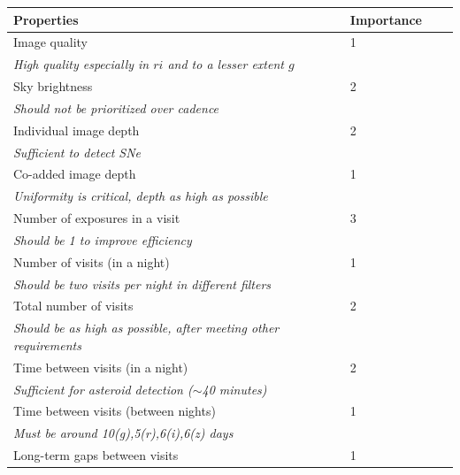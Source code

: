 \documentclass[12pt, letterpaper]{article}
\begin{document}
\newpage

\begin{minipage}{\columnwidth}
    \centering
    \begin{tabular}{l|l|l|l}
        \toprule
        Properties & Importance \hspace{.3in} \\
        \midrule
        Image quality  &  1   \\
        \hspace{20pt} \emph{High quality especially in $ri$ and to a lesser extent $g$} & \\
        Sky brightness & 2 \\
        \hspace{20pt} \emph{Should not be prioritized over cadence} &\\
        Individual image depth &  2 \\
        \hspace{20pt} \emph{Sufficient to detect SNe} & \\
        Co-added image depth  &  1 \\
        \hspace{20pt} \emph{Uniformity is critical, depth as high as possible} & \\
        Number of exposures in a visit  & 3  \\
        \hspace{20pt} \emph{Should be 1 to improve efficiency} & \\
        Number of visits (in a night) & 1\\ 
        \hspace{20pt} \emph{Should be two visits per night in different filters} & \\ 
        Total number of visits &  2 \\
        \hspace{20pt} \emph{Should be as high as possible, after meeting other requirements}&\\
        Time between visits (in a night) & 2\\
        \hspace{20pt} \emph{Sufficient for asteroid detection ($\sim$40 minutes)} &  \\
        Time between visits (between nights)  &  1 \\
        \hspace{20pt} \emph{Must be around 10(g),5(r),6(i),6(z) days} & \\
        Long-term gaps between visits  & 1\\ 

\end{tabular}
\end{minipage}
\end{document}
